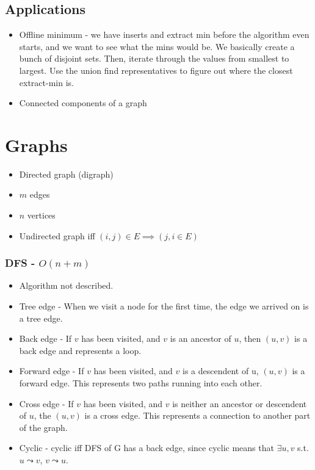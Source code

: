 \subsection{Applications}
\begin{itemize}
    \item Offline minimum - we have inserts and extract min before the algorithm even starts, and we want to see what the mins would be. We basically create a bunch of disjoint sets. Then, iterate through the values from smallest to largest. Use the union find representatives to figure out where the closest extract-min is.
    \item Connected components of a graph
\end{itemize}
\section{Graphs}
\begin{itemize}
    \item Directed graph (digraph)
    \item $m$ edges
    \item $n$ vertices
    \item Undirected graph iff $(i,j) \in E \implies (j, i \in E)$
\end{itemize}
\subsubsection{DFS - $O(n+m)$}
\begin{itemize}
    \item Algorithm not described.
    \item Tree edge - When we visit a node for the first time, the edge we arrived on is a tree edge.
    \item Back edge - If $v$ has been visited, and $v$ is an ancestor of $u$, then $(u,v)$ is a back edge and represents a loop.
    \item Forward edge - If $v$ has been visited, and $v$ is a descendent of u, $(u, v)$ is a forward edge. This represents two paths running into each other.
    \item Cross edge - If $v$ has been visited, and $v$ is neither an ancestor or descendent of $u$, the $(u,v)$ is a cross edge. This represents a connection to another part of the graph.
    \item Cyclic - cyclic iff DFS of G has a back edge, since cyclic means that $\exists u, v$ s.t. $u\leadsto v$, $v\leadsto u$.
\end{itemize}

